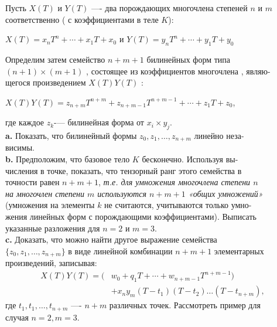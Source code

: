 \documentclass{mai_book}
\begin{document}
\medskip
\indent Пусть $X(T)$ и $Y(T)$ —- два порождающих многочлена степеней $n$ и $m$ \\ соответственно ( с коэффициентами в теле $K$):\\
\begin{center}
$X(T) = x_nT^n + \cdots + x_1T + x_0$ и $Y(T) = y_nT^n + \cdots + y_1T + y_0$
\end{center}
Определим затем семейство $n+m+1$ билинейных форм типа \\ $(n+1) \times (m+1)$ , состоящее из коэффициентов многочлена , являю-\\щегося произведением $X(T)Y(T)$ : \\
\begin{center}
$X(T)Y(T) = z_{n+m}T^{n+m} + z_{n+m-1}T^{n+m-1} + \cdots + z_1T + z_0 $,
\end{center}
где каждое $z_k$-— билинейная форма от $x_i \times y_j$. \\
\indent \textbf{a.} \quad Показать, что билинейный формы $z_0, z_1, \ldots , z_{n+m}$ линейно неза-\\висимы. \\
\indent \textbf{b.} \quad Предположим, что базовое тело $K$ бесконечно. Используя
вы-\\числения в точке, показать, что тензорный ранг этого семейства в \\
точности равен $n+m+1$,\textit{ т.е. для умножения многочлена степени $n$\\
на многочлен степени $m$ используются $n+m+1$ «общих умножений»}
(умножения на элементы $k$ не считаются, учитываются только
умно-\\жения линейных форм с порождающими коэффициентами). Выписать\\
указанные разложения для $n = 2$ и $m = 3$. \\
\indent \textbf{c.} \quad Доказать, что можно найти другое выражение семейства\\
$\{z_0, z_1,\ldots, z_{n+m}\}$ в виде линейной комбинации $n+m+1$ элементарных\\
произведений, записывая:
\begin{align*}
X(T)Y(T) = (&w_0 + q_1T + \cdots + w_{n+m-1}T^{n+m-1}) \\ &+ x_ny_m(T-t_1)(T-t_2)\ldots (T-t_{n+m}),
\end{align*}
\noindent где $t_1, t_1, \ldots, t_{n+m}$ —- $ n + m$ различных точек. Рассмотреть пример для \\ случая $n = 2, m=3$.\\
\end{document}
